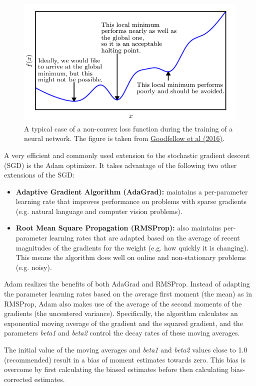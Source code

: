 \documentclass[12pt]{article}
\theoremstyle{plain}
\begin{document}
\begin{figure}[h!]
    \centering
	\includegraphics[width=.7\linewidth]{media/grad_desc_fig2.png}
	\caption{A typical case of a non-convex loss function during the training of a neural network. The figure is taken from \protect\hyperlink{Deeplea_Goodfellow}{Goodfellow et al (2016)}.}
	\label{grad_desc_fig_2}
\end{figure}

A very efficient and commonly used extension to the stochastic gradient descent (SGD) is the Adam optimizer. It takes advantage of the following two other extensions of the SGD:

\begin{itemize}
	\item \textbf{Adaptive Gradient Algorithm (AdaGrad):} maintains a per-parameter learning rate that improves performance on problems with sparse gradients (e.g. natural language and computer vision problems).
	\item \textbf{Root Mean Square Propagation (RMSProp):} also maintains per-parameter learning rates that are adapted based on the average of recent magnitudes of the gradients for the weight (e.g. how quickly it is changing). This means the algorithm does well on online and non-stationary problems (e.g. noisy).

\end{itemize}

Adam realizes the benefits of both AdaGrad and RMSProp. Instead of adapting the parameter learning rates based on the average first moment (the mean) as in RMSProp, Adam also makes use of the average of the second moments of the gradients (the uncentered variance). Specifically, the algorithm calculates an exponential moving average of the gradient and the squared gradient, and the parameters \textit{beta1} and \textit{beta2} control the decay rates of these moving averages.

The initial value of the moving averages and \textit{beta1} and \textit{beta2} values close to 1.0 (recommended) result in a bias of moment estimates towards zero. This bias is overcome by first calculating the biased estimates before then calculating bias-corrected estimates.
\end{document}
